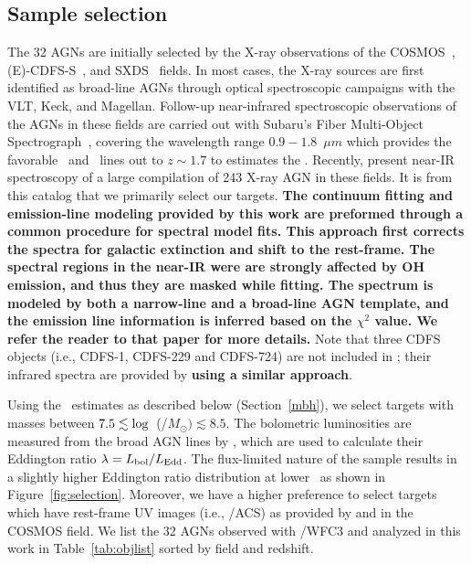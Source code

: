 \documentclass[apj]{emulateapj}
\begin{document}
\subsection{Sample selection}\label{sec:target_selection}

The 32 AGNs are initially selected by the X-ray observations of the COSMOS~\citep{Civano2016}, (E)-CDFS-S~\citep{Lehmer2005, Xue2011}, and SXDS~\citep{Ueda2008} fields. In most cases, the X-ray sources are first identified as broad-line AGNs through optical spectroscopic campaigns with the VLT, Keck, and Magellan. Follow-up near-infrared spectroscopic observations of the AGNs in these fields are carried out with Subaru's Fiber Multi-Object Spectrograph~\citep[FMOS, ][]{Kimura2010, Nobuta2012,Matsuoka2013}, covering the wavelength range $0.9-1.8$~$\mu m$ which provides the favorable \halpha\ and \hbeta\ lines out to $z\sim1.7$ to estimates the \mbh. Recently, \citet{Schulze2018} present near-IR spectroscopy of a large compilation of 243 X-ray AGN in these fields. It is from this catalog that we primarily select our targets. 
{\bf The continuum fitting and emission-line modeling provided by this work are preformed through a common procedure for spectral model fits. This approach first corrects the spectra for galactic extinction and shift to the rest-frame. The spectral regions in the near-IR were are strongly affected by OH emission, and thus they are masked while fitting. The spectrum is modeled by both a narrow-line and a broad-line AGN template, and the emission line information is inferred based on the $\chi^2$ value. We refer the reader to that paper for more details.}
Note that three CDFS objects (i.e., CDFS-1, CDFS-229 and CDFS-724) are not included in \citet{Schulze2018}; their infrared spectra are provided by \citet{Suh2015} {\bf using a similar approach}.

Using the \mbh\ estimates as described below (Section~\ref{mbh}), we select targets with masses between $7.5 \lesssim {\rm log}$~(\mbh/$M_{\odot})\lesssim8.5$. The bolometric luminosities are measured from the broad AGN lines by \citet[][Section 3.3]{Schulze2018}, which are used to calculate their Eddington ratio $\lambda = L_{\rm bol}/L_{\rm Edd}$. The flux-limited nature of the sample results in a slightly higher Eddington ratio distribution at lower \mbh\, as shown in Figure~\ref{fig:selection}. Moreover, we have a higher preference to select targets which have rest-frame UV images (i.e., \hst/ACS) as provided by \citet{Scoville2007} and \citet{Koekemoer2007} in the COSMOS field. We list the 32 AGNs observed with \hst/WFC3 and analyzed in this work in Table~\ref{tab:objlist} sorted by field and redshift.
\end{document}
